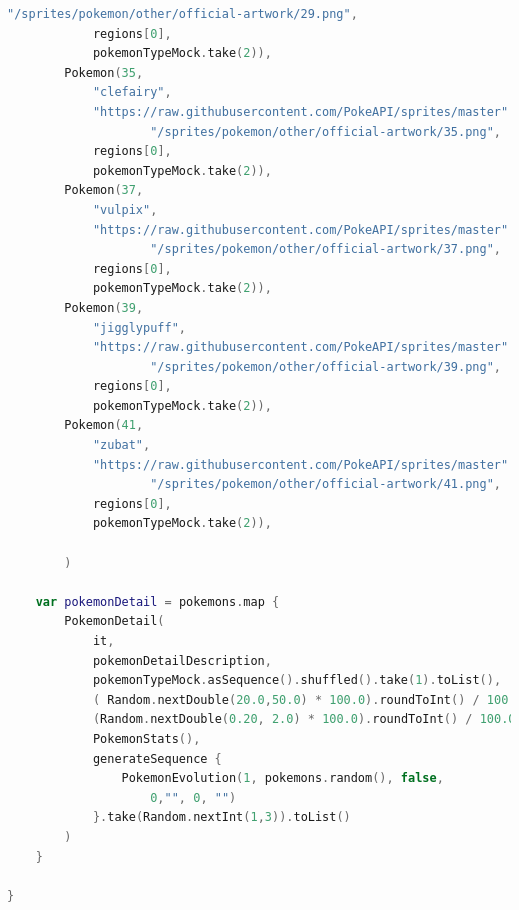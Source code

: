 \documentclass[a4paper, 12pt]{article}
\begin{document}
\begin{lstlisting}[caption={PokemonMockData Object.}, label={code:mockData}, language=Kotlin]
                    "/sprites/pokemon/other/official-artwork/29.png",
            regions[0],
            pokemonTypeMock.take(2)),
        Pokemon(35,
            "clefairy",
            "https://raw.githubusercontent.com/PokeAPI/sprites/master" +
                    "/sprites/pokemon/other/official-artwork/35.png",
            regions[0],
            pokemonTypeMock.take(2)),
        Pokemon(37,
            "vulpix",
            "https://raw.githubusercontent.com/PokeAPI/sprites/master" +
                    "/sprites/pokemon/other/official-artwork/37.png",
            regions[0],
            pokemonTypeMock.take(2)),
        Pokemon(39,
            "jigglypuff",
            "https://raw.githubusercontent.com/PokeAPI/sprites/master" +
                    "/sprites/pokemon/other/official-artwork/39.png",
            regions[0],
            pokemonTypeMock.take(2)),
        Pokemon(41,
            "zubat",
            "https://raw.githubusercontent.com/PokeAPI/sprites/master" +
                    "/sprites/pokemon/other/official-artwork/41.png",
            regions[0],
            pokemonTypeMock.take(2)),

        )

    var pokemonDetail = pokemons.map {
        PokemonDetail(
            it,
            pokemonDetailDescription,
            pokemonTypeMock.asSequence().shuffled().take(1).toList(),
            ( Random.nextDouble(20.0,50.0) * 100.0).roundToInt() / 100.0,
            (Random.nextDouble(0.20, 2.0) * 100.0).roundToInt() / 100.0,
            PokemonStats(),
            generateSequence {
                PokemonEvolution(1, pokemons.random(), false,
                    0,"", 0, "")
            }.take(Random.nextInt(1,3)).toList()
        )
    }

}
\end{lstlisting}
\end{document}
